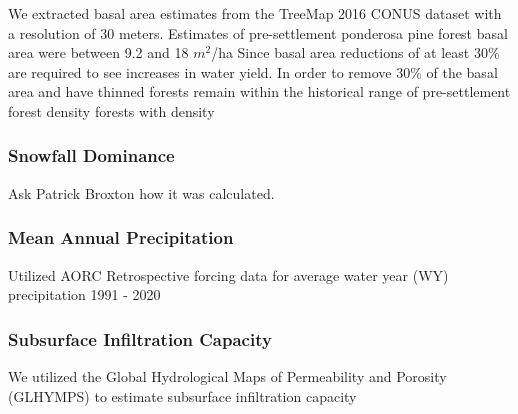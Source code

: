 \documentclass[
  number,
  preprint,
  3p,
  onecolumn]{elsarticle}
\begin{document}
We extracted basal area estimates from the TreeMap 2016
\citep{riley2022} CONUS dataset with a resolution of 30 meters.
Estimates of pre-settlement ponderosa pine forest basal area were
between 9.2 and 18 \(m^2\)/ha Since basal area reductions of at least
30\% are required to see increases in water yield. In order to remove
30\% of the basal area and have thinned forests remain within the
historical range of pre-settlement forest density forests with density

\subsubsection{Snowfall Dominance}\label{snowfall-dominance}

Ask Patrick Broxton how it was calculated.

\subsubsection{Mean Annual
Precipitation}\label{mean-annual-precipitation}

Utilized AORC Retrospective forcing data for average water year (WY)
precipitation 1991 - 2020

\subsubsection{Subsurface Infiltration
Capacity}\label{subsurface-infiltration-capacity}

We utilized the Global Hydrological Maps of Permeability and Porosity
(GLHYMPS) to estimate subsurface infiltration capacity
\citep{gleeson2014}
\end{document}
